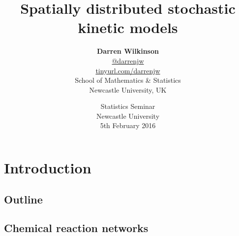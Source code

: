 \documentclass[mathserif]{beamer}
\begin{document}
\title{Spatially distributed stochastic kinetic models}
\author[Darren Wilkinson --- Statistics seminar, 5/2/16]{\textbf{\large Darren Wilkinson} \\
\url{@darrenjw}\\
\alert{\url{tinyurl.com/darrenjw}}\\
School of Mathematics \& Statistics\\Newcastle University, UK}
\date{Statistics Seminar\\Newcastle University\\5th February 2016}

\frame{\titlepage}

\section{Introduction}

\subsection{Outline}


\subsection{Chemical reaction networks}
\end{document}
